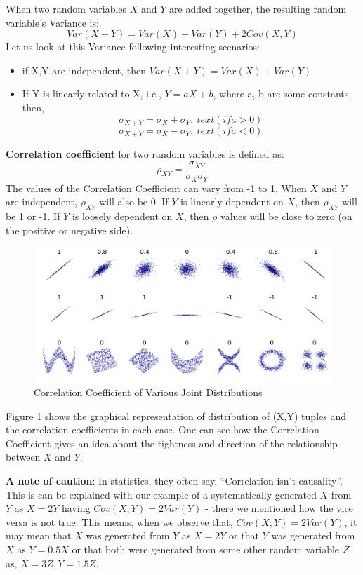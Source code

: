 When two random variables $X$ and $Y$ are added together, the resulting random variable's Variance is:
	\[ Var(X+Y) = Var(X) + Var(Y) + 2Cov(X,Y) \]
Let us look at this Variance following interesting scenarios:
	\begin{itemize}
	\item if X,Y are independent, then \( Var(X+Y) = Var(X) + Var(Y) \)
	\item  If Y is linearly related to X, i.e., \( Y = aX+b \), where a, b are some constants, then,
		\[ \sigma_{X+Y} = \sigma_X + \sigma_Y,\ text(if a>0) \]
		\[ \sigma_{X+Y} = \sigma_X - \sigma_Y,\ text(if a<0) \]
	\end{itemize}
	
\textbf{Correlation coefficient} for two random variables is defined as:
	\[ \rho_{XY} = \frac{\sigma_{XY}}{\sigma_X \sigma_Y} \]
The values of the Correlation Coefficient can vary from -1 to 1. When $X$ and $Y$ are independent, $\rho_{XY}$ will also be 0. If $Y$ is linearly dependent on $X$, then $\rho_{XY}$ will be 1 or -1. If $Y$ is loosely dependent on $X$, then $\rho$ values will be close to zero (on the positive or negative side). 
	\begin{figure}
	  \centering
	    \includegraphics[width=\textwidth]{Statistics/correlation}
	  \caption{Correlation Coefficient of Various Joint Distributions}
	  \label{fig:correlation}
	\end{figure}

Figure \ref{fig:correlation} shows the graphical representation of distribution of (X,Y) tuples and the correlation coefficients in each case. One can see how the Correlation Coefficient gives an idea about the tightness and direction of the relationship between $X$ and $Y$.

\textbf{A note of caution}: In statistics, they often say, ``Correlation isn't causality''. This is can be explained with our example of a systematically generated $X$ from $Y$ as $X=2Y$ having \(Cov(X,Y) = 2Var(Y)\) - there we mentioned how the vice versa is not true. This means, when we observe that, \(Cov(X,Y) = 2Var(Y)\), it may mean that $X$ was generated from $Y$ as $X=2Y$ or that $Y$ was generated from $X$ as $Y=0.5X$ or that both were generated from some other random variable $Z$ as, $X = 3Z, Y = 1.5Z$. 

